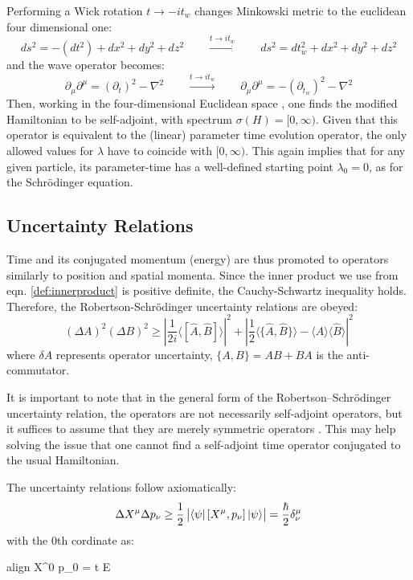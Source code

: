 \documentclass[a4paper,10pt]{article}
\numberwithin{equation}{section}
\newcommand{\boxedeq}[2]{\begin{empheq}[box={\fboxsep=6pt\fbox}]{align}\label{#1}#2\end{empheq}}
\begin{document}
Performing a Wick rotation $t \to -it_w$ changes Minkowski metric to the euclidean four dimensional one:
\begin{equation}
ds^{2}=-(dt^{2})+dx^{2}+dy^{2}+dz^{2} \qquad \xrightarrow{t \to it_w}  \qquad  ds^{2}=d t_w ^{2}+dx^{2}+dy^{2}+dz^{2}
\end{equation}
and the wave operator becomes:
\begin{equation}
    \partial_\mu \partial^\mu = (\partial_t)^2 - \nabla^2 \qquad  \xrightarrow{t \to it_w}  \qquad \partial_\mu\partial^\mu = - (\partial_{t_w})^2 - \nabla^2
\end{equation}
Then, working in the four-dimensional Euclidean space , one finds the modified Hamiltonian to be self-adjoint, with spectrum $\sigma(H) = [0, \infty)$. Given that this operator is equivalent to the (linear) parameter time evolution operator, the only allowed values for $\lambda$ have to coincide with $[0, \infty)$. This again implies that for any given particle, its parameter-time has a well-defined starting point $\lambda_0 = 0$, as for the Schr{\"o}dinger equation.  

\subsection{Uncertainty Relations}
Time and its conjugated momentum (energy) are thus promoted to operators similarly to position and spatial momenta. Since the inner product we use from eqn. \ref{def:innerproduct} is positive definite, the Cauchy-Schwartz inequality holds. Therefore, the Robertson-Schr{\"o}dinger uncertainty relations are obeyed:
\begin{equation}
 (\Delta{A})^{2}(\Delta{B})^{2}\geq \left|{\frac {1}{2i}}\langle [{\hat {A}},{\hat {B}}]\rangle \right|^{2} + \left|{\frac {1}{2}}\langle \{{\hat {A}},{\hat {B}}\}\rangle -\langle {\hat {A}}\rangle \langle {\hat {B}}\rangle \right|^{2}
\end{equation}
where $\delta A$ represents operator uncertainty, $\{A, B\} = AB + BA$ is the anti-commutator.

It is important to note that in the general form of the Robertson–Schr{\"o}dinger uncertainty relation, the operators are not necessarily self-adjoint operators, but it suffices to assume that they are merely symmetric operators \cite{HallUR}. This may help solving the issue that one cannot find a self-adjoint time operator conjugated to the usual Hamiltonian. 

The uncertainty relations follow axiomatically:
\begin{equation}
    \Delta X^{\mu} \Delta p_{\nu} \geq \frac{1}{2} \left|  \bra{\psi} \left[ X^\mu, p_\nu \right] \ket{\psi} \right| =  \delta_\nu^\mu 
\end{equation}    
with the 0th cordinate as:
\boxedeq{THERESULT}{
      \Delta X^{0} \Delta p_{0} = \Delta t \Delta E \geq \frac{\hbar}{2}
}   
\end{document}
